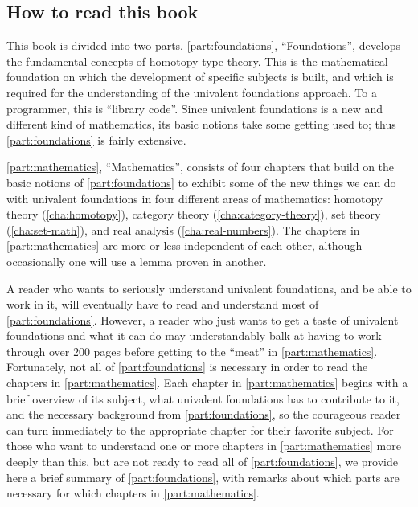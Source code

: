 \subsection*{How to read this book}

This book is divided into two parts.
\autoref{part:foundations}, ``Foundations'', develops the fundamental concepts of homotopy type theory.
This is the mathematical foundation on which the development of specific subjects is built, and which is required for the understanding of the univalent foundations approach. To a programmer, this is ``library code''.
Since univalent foundations is a new and different kind of mathematics, its basic notions take some getting used to; thus \autoref{part:foundations} is fairly extensive.

\autoref{part:mathematics}, ``Mathematics'', consists of four chapters that build on the basic notions of \autoref{part:foundations} to exhibit some of the new things we can do with univalent foundations in four different areas of mathematics: homotopy theory (\autoref{cha:homotopy}), category theory (\autoref{cha:category-theory}), set theory (\autoref{cha:set-math}), and real analysis (\autoref{cha:real-numbers}).
The chapters in \autoref{part:mathematics} are more or less independent of each other, although occasionally one will use a lemma proven in another.

A reader who wants to seriously understand univalent foundations, and be able to work in it, will eventually have to read and understand most of \autoref{part:foundations}.
However, a reader who just wants to get a taste of univalent foundations and what it can do may understandably balk at having to work through over 200 pages before getting to the ``meat'' in \autoref{part:mathematics}.
Fortunately, not all of \autoref{part:foundations} is necessary in order to read the chapters in \autoref{part:mathematics}.
Each chapter in \autoref{part:mathematics} begins with a brief overview of its subject, what univalent foundations has to contribute to it, and the necessary background from \autoref{part:foundations}, so the courageous reader can turn immediately to the appropriate chapter for their favorite subject.
For those who want to understand one or more chapters in \autoref{part:mathematics} more deeply than this, but are not ready to read all of \autoref{part:foundations}, we provide here a brief summary of \autoref{part:foundations}, with remarks about which parts are necessary for which chapters in \autoref{part:mathematics}.

